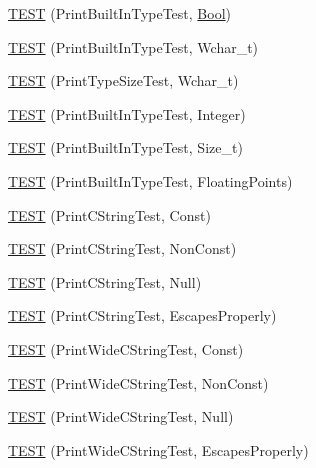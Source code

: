\begin{DoxyCompactItemize}
\hyperlink{namespacetesting_1_1gtest__printers__test_a6f08c464dc0b8eb822368f552d4467ad}{T\-E\-S\-T} (Print\-Built\-In\-Type\-Test, \hyperlink{struct_bool}{Bool})
\item 
\hyperlink{namespacetesting_1_1gtest__printers__test_ab567ebd97eff0a4b9a20a5f5cb77d678}{T\-E\-S\-T} (Print\-Built\-In\-Type\-Test, Wchar\-\_\-t)
\item 
\hyperlink{namespacetesting_1_1gtest__printers__test_a705ec4c2886606a22194107397fceea6}{T\-E\-S\-T} (Print\-Type\-Size\-Test, Wchar\-\_\-t)
\item 
\hyperlink{namespacetesting_1_1gtest__printers__test_a278d53e99390c7b31ff531524fe5e86e}{T\-E\-S\-T} (Print\-Built\-In\-Type\-Test, Integer)
\item 
\hyperlink{namespacetesting_1_1gtest__printers__test_a991dc124d153742c3ca126b2fa9ccab5}{T\-E\-S\-T} (Print\-Built\-In\-Type\-Test, Size\-\_\-t)
\item 
\hyperlink{namespacetesting_1_1gtest__printers__test_acde0b28d177604ddb5e185d7b107f6f7}{T\-E\-S\-T} (Print\-Built\-In\-Type\-Test, Floating\-Points)
\item 
\hyperlink{namespacetesting_1_1gtest__printers__test_a6cd47b21ad8d9ac66ba57b5b6415a924}{T\-E\-S\-T} (Print\-C\-String\-Test, Const)
\item 
\hyperlink{namespacetesting_1_1gtest__printers__test_a89d9905fecee1b976c26d35498734dd4}{T\-E\-S\-T} (Print\-C\-String\-Test, Non\-Const)
\item 
\hyperlink{namespacetesting_1_1gtest__printers__test_ad29b97d58a4d1e5e8dd4d854f66b9e22}{T\-E\-S\-T} (Print\-C\-String\-Test, Null)
\item 
\hyperlink{namespacetesting_1_1gtest__printers__test_a140030b990011abab91d4c0b59f21edd}{T\-E\-S\-T} (Print\-C\-String\-Test, Escapes\-Properly)
\item 
\hyperlink{namespacetesting_1_1gtest__printers__test_a4caa1f81979cdc6f5ada95e01a4fae63}{T\-E\-S\-T} (Print\-Wide\-C\-String\-Test, Const)
\item 
\hyperlink{namespacetesting_1_1gtest__printers__test_a8812b5f088e13083ebb8a7e35fbcdae7}{T\-E\-S\-T} (Print\-Wide\-C\-String\-Test, Non\-Const)
\item 
\hyperlink{namespacetesting_1_1gtest__printers__test_acd1267d49d61ad53b2b8a88f68fca3a7}{T\-E\-S\-T} (Print\-Wide\-C\-String\-Test, Null)
\item 
\hyperlink{namespacetesting_1_1gtest__printers__test_aa80d6bb47e6bf997dacf0c75322d12cf}{T\-E\-S\-T} (Print\-Wide\-C\-String\-Test, Escapes\-Properly)

\end{DoxyCompactItemize}
